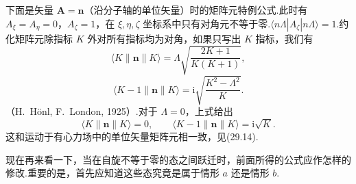下面是矢量 $\boldsymbol{A}=\boldsymbol{n}$（沿分子轴的单位矢量）时的矩阵元特例公式.此时有 $A_\xi=A_\eta=0$，$A_\zeta=1$，在 $\xi,\eta,\zeta$ 坐标系中只有对角元不等于零.$\langle n\Lambda|A_\zeta|n\Lambda\rangle=1$.约化矩阵元除指标 $K$ 外对所有指标均为对角，如果只写出 $K$ 指标，我们有
\begin{equation*}
  \langle K\parallel\boldsymbol{n}\parallel K\rangle
  =\Lambda\sqrt{\frac{2K+1}{K(K+1)}},
\end{equation*}
\begin{equation}
  \langle K-1\parallel\boldsymbol{n}\parallel K\rangle
  =\mathrm{i}\sqrt{\frac{K^2-\Lambda^2}{K}}.
\end{equation}
（H.~H\"{o}nl, F.~London, 1925）.对于 $\Lambda=0$，上式给出
\begin{equation*}
  \langle K\parallel\boldsymbol{n}\parallel K\rangle=0,\qquad
  \langle K-1\parallel\boldsymbol{n}\parallel K\rangle=\mathrm{i}\sqrt{K}.
\end{equation*}
这和运动于有心力场中的单位矢量矩阵元相一致，见(29.14).

现在再来看一下，当在自旋不等于零的态之间跃迁时，前面所得的公式应作怎样的修改.重要的是，首先应知道这些态究竟是属于情形 $a$ 还是情形 $b$.

